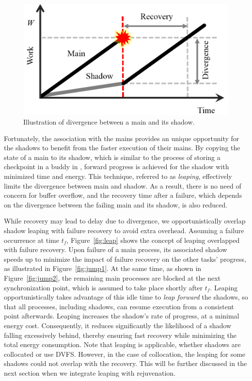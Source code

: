 \begin{figure}[!t]
	\begin{center}
			\includegraphics[width=\columnwidth]{Figures/divergence}
	\end{center}
	\caption{Illustration of divergence between a main and its shadow.}
	\label{fig:divergence}
\end{figure}
 
Fortunately, the association with the mains provides an unique opportunity for the shadows to benefit from the faster execution of their mains. By copying the state of a main to its shadow, which is similar to the process of storing a checkpoint in a buddy in \cite{zheng_2004_ftccharm}, forward progress is achieved for the shadow with minimized time and energy. This technique, referred to as \textit{leaping}, effectively limits the divergence between main and shadow. 
As a result, there is no need of concern for buffer overflow, and the recovery time after a failure, which depends on the divergence between the failing main 
and its shadow, is also reduced. 


While recovery may lead to delay due to divergence, we opportunistically overlap shadow leaping with failure recovery to avoid extra overhead. 
Assuming a failure occurrence at time $t_f$, Figure~\ref{fig:leap} shows the concept of leaping overlapped with failure recovery. 
Upon failure of a main process, its associated shadow speeds up to minimize the impact of failure recovery on the other tasks' progress, as illustrated in Figure~\ref{fig:jump1}. 
At the same time, as shown in Figure~\ref{fig:jump2}, the remaining main processes are blocked
at the next synchronization point, which is assumed to take
place shortly after $t_f$. 
Leaping opportunistically takes advantage of this idle time to {\it leap forward} the shadows, so that  
all processes, including shadows, can resume execution from a consistent point afterwards. 
Leaping increases the shadow's rate of progress, at a minimal energy cost. Consequently, it reduces significantly the likelihood of a shadow falling excessively behind, thereby ensuring fast recovery while minimizing the total energy consumption. Note that leaping is applicable, whether shadows are collocated or use DVFS. However, in the case of collocation, the leaping for some shadows could not overlap with the recovery. This will be further discussed in the next section when we integrate leaping with rejuvenation.  


